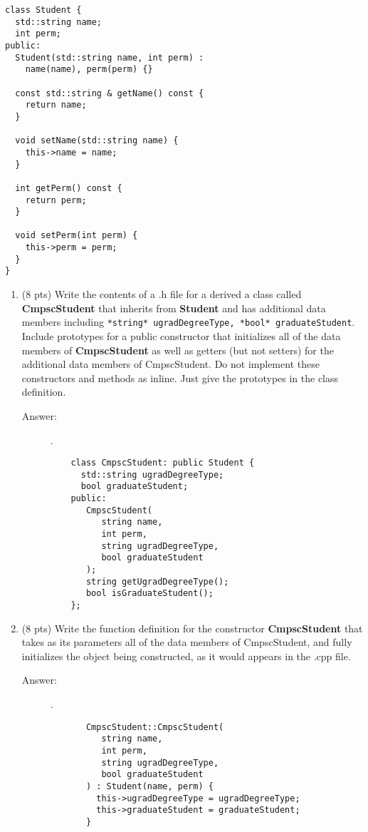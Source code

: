 \documentclass[11pt]{article}
\begin{document}
\begin{verbatim}
class Student {
  std::string name;
  int perm;
public:
  Student(std::string name, int perm) :
    name(name), perm(perm) {}

  const std::string & getName() const {
    return name;
  }

  void setName(std::string name) {
    this->name = name;
  }

  int getPerm() const {
    return perm;
  }

  void setPerm(int perm) {
    this->perm = perm;
  }
}
\end{verbatim}

\begin{enumerate}
\item (8 pts) Write the contents of a .h file for a derived a class called
\textbf{CmpscStudent} that inherits from \textbf{Student} and has additional data members
including \texttt{*string* ugradDegreeType, *bool* graduateStudent}.  Include
prototypes for a public constructor that initializes all of the data members
of \textbf{CmpscStudent} as well as getters (but not setters) for the additional
data members of CmpscStudent. Do not implement these constructors and methods
as inline. Just give the prototypes in the class definition.

\begin{description}
  \item[Answer:] .\\
  \begin{verbatim}
    class CmpscStudent: public Student {
      std::string ugradDegreeType;
      bool graduateStudent;
    public:
       CmpscStudent(
          string name,
          int perm,
          string ugradDegreeType,
          bool graduateStudent
       );
       string getUgradDegreeType();
       bool isGraduateStudent();
    };
    \end{verbatim}
\end{description}

\newpage

\item (8 pts) Write the function definition for the constructor
\textbf{CmpscStudent} that takes as its parameters all of the data members
of CmpscStudent, and fully initializes the object being constructed,
as it would appears in the .cpp file.

\begin{description}
  \item[Answer:] .\\
  \begin{verbatim}
       CmpscStudent::CmpscStudent(
          string name,
          int perm,
          string ugradDegreeType,
          bool graduateStudent
       ) : Student(name, perm) {
         this->ugradDegreeType = ugradDegreeType;
         this->graduateStudent = graduateStudent;
       }
    \end{verbatim}
\end{description}

\end{enumerate}
\end{document}
